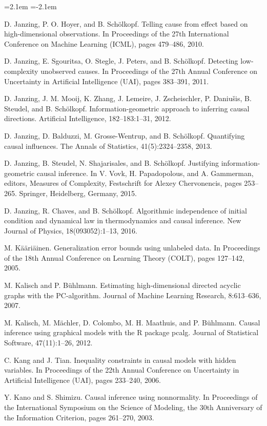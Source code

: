 \begin{list}{}{\leftmargin=2.1em
 \itemindent=-2.1em\parsep=0pt\itemsep=3pt}
\item D. Janzing, P. O. Hoyer, and B. Schölkopf. Telling cause from effect based on high-dimensional observations. In Proceedings of the 27th International Conference on Machine Learning (ICML), pages 479--486, 2010.
\item D. Janzing, E. Sgouritsa, O. Stegle, J. Peters, and B. Schölkopf. Detecting low-complexity unobserved causes. In Proceedings of the 27th Annual Conference on Uncertainty in Artificial Intelligence (UAI), pages 383--391, 2011.
\item D. Janzing, J. M. Mooij, K. Zhang, J. Lemeire, J. Zscheischler, P. Daniušis, B. Steudel, and B. Schölkopf. Information-geometric approach to inferring causal directions. Artificial Intelligence, 182--183:1--31, 2012.
\item D. Janzing, D. Balduzzi, M. Grosse-Wentrup, and B. Schölkopf. Quantifying causal influences. The Annals of Statistics, 41(5):2324--2358, 2013.
\item D. Janzing, B. Steudel, N. Shajarisales, and B. Schölkopf. Justifying information-geometric causal inference. In V. Vovk, H. Papadopolous, and A. Gammerman, editors, Measures of Complexity, Festschrift for Alexey Chervonencis, pages 253--265. Springer, Heidelberg, Germany, 2015.
\item D. Janzing, R. Chaves, and B. Schölkopf. Algorithmic independence of initial condition and dynamical law in thermodynamics and causal inference. New Journal of Physics, 18(093052):1--13, 2016.
\item M. Kääriäinen. Generalization error bounds using unlabeled data. In Proceedings of the 18th Annual Conference on Learning Theory (COLT), pages 127--142, 2005.
\item M. Kalisch and P. Bühlmann. Estimating high-dimensional directed acyclic graphs with the PC-algorithm. Journal of Machine Learning Research, 8:613--636, 2007.
\item M. Kalisch, M. Mächler, D. Colombo, M. H. Maathuis, and P. Bühlmann. Causal inference using graphical models with the R package pcalg. Journal of Statistical Software, 47(11):1--26, 2012.
\item C. Kang and J. Tian. Inequality constraints in causal models with hidden variables. In Proceedings of the 22th Annual Conference on Uncertainty in Artificial Intelligence (UAI), pages 233--240, 2006.
\item Y. Kano and S. Shimizu. Causal inference using nonnormality. In Proceedings of the International Symposium on the Science of Modeling, the 30th Anniversary of the Information Criterion, pages 261--270, 2003.

\end{list}
